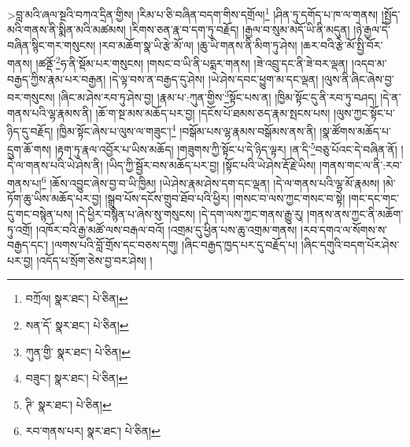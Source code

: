 >བླ་མའི་ཞལ་སྔའི་བཀའ་དྲིན་གྱིས། །རིམ་པ་ཅི་བཞིན་བདག་གིས་དགྲོལ།\footnote{བཀྲོལ།  སྣར་ཐང་།  པེ་ཅིན། } །ཤིན་ཏུ་དགོད་པ་ཁ་ལ་གནས། །སྤྱོད་མའི་གནས་ནི་སྨིན་མའི་མཚམས། །རིགས་ཅན་རྣ་བ་དག་ཏུ་བརྗོད། །རྒྱལ་བ་སུམ་མདོ་ཡི་ནི་མདུན། །ཉེ་རྒྱལ་དེ་བཞིན་སྙིང་གར་གསུངས། །རབ་མཆོག་སྣ་ཡི་རྩེ་མོ་ལ། །ཆུ་ཡི་གནས་ནི་མིག་ཏུ་ཤེས། །ཆར་བའི་རྩེ་མོ་སྤྱི་བོར་གནས། །ཚནྡོ་\footnote{སན་དོ་  སྣར་ཐང་།  པེ་ཅིན། }ཧ་ནི་སྡོམ་པར་གསུངས། །གསང་བ་ཡི་ནི་པདྨར་གནས། །ཟེ་འབྲུ་དང་ནི་ཟེ་བར་ལྡན། །འདབ་མ་བརྒྱད་ཀྱིས་རྣམ་པར་བརྒྱན། །དེ་ལྟ་བས་ན་བརྒྱད་དུ་ཤེས། །ཡེ་ཤེས་དབང་ཕྱུག་མ་དང་ལྡན། །ལུས་ནི་ཞིང་ཞེས་བྱ་བར་གསུངས། །ཞིང་མ་ཤེས་རབ་ཏུ་ཤེས་བྱ། །རྣམ་པ་:ཀུན་གྱིས་\footnote{ཀུན་གྱི་  སྣར་ཐང་།  པེ་ཅིན། }སྟོང་པས་ན། །ཁྱིམ་སྟོང་དུ་ནི་རབ་ཏུ་བཤད། །དེ་ན་གནས་པའི་ལྷ་རྣམས་ནི། །ཆོ་ག་སྔ་མས་མཆོད་པར་བྱ། །དངོས་པོ་ཐམས་ཅད་རྣམ་སྤངས་པས། །ལུས་ཀྱང་སྟོང་པ་ཉིད་དུ་བརྗོད། །ཁྱིམ་སྟོང་ཞེས་པ་ལུས་ལ་གཟུང་།\footnote{བཟུང་།  སྣར་ཐང་།  པེ་ཅིན། } །བསྒོམ་པས་ལྷ་རྣམས་བསྒོམས་ནས་ནི། །སྣ་ཚོགས་མཆོད་པ་དྲུག་ཆོ་གས། །རྟག་ཏུ་རྣལ་འབྱོར་པ་ཡིས་མཆོད། །གཟུགས་ཀྱི་སྟོང་པ་དེ་ཉིད་ལྟར། །ན་དི་\footnote{ཊི་  སྣར་ཐང་།  པེ་ཅིན། }བཅུ་པོའང་དེ་བཞིན་ནོ། །དེ་ལ་གནས་པའི་ཡེ་ཤེས་ནི། །ཡིད་ཀྱི་སྦྱོར་བས་མཆོད་པར་བྱ། །སྟོང་པའི་ཡེ་ཤེས་རྡོ་རྗེ་ཡིས། །གནས་གང་ལ་ནི་:རབ་གནས་པ།\footnote{རབ་གནས་པར།  སྣར་ཐང་།  པེ་ཅིན། } །ཆོས་འབྱུང་ཞེས་བྱ་བ་ཡི་ཁྱིམ། །ཡེ་ཤེས་རྣམ་ཤེས་དག་དང་ལྡན། །དེ་ལ་གནས་པའི་ལྷ་མོ་རྣམས། །མེ་ཏོག་ཆུ་ཡིས་མཆོད་པར་བྱ། །སྒྲུབ་པོས་དངོས་གྲུབ་ཐོབ་པའི་ཕྱིར། །གསང་བ་ལས་ཀྱང་གསང་བ་སྟེ། །གང་དང་གང་དུ་གང་བསྙེན་པས། །དེ་ཕྱིར་བསྙེན་པ་ཞེས་སུ་གསུངས། །དེ་དག་ལས་ཀྱང་གནས་རྒྱུ་རུ། །གནས་ནས་ཀྱང་ནི་མཆོག་ཏུ་འགྲོ། །འཁོར་བའི་རྒྱ་མཚོ་ལས་བརྒལ་བའོ། །འགྲམ་དུ་ཕྱིན་པས་ཆུ་འགྲམ་གནས། །རབ་དགའ་ལ་སོགས་ས་བརྒྱད་དང་། །ལགས་པའི་བློ་གྲོས་དང་བཅས་དགུ། །ཞིང་བརྒྱད་ཁྱད་པར་དུ་བརྗོད་པ། །ཞིང་དགུའི་བདག་པོར་ཤེས་པར་བྱ། །འདོད་པ་སྲོག་ཅེས་བྱ་བར་ཤེས། །
